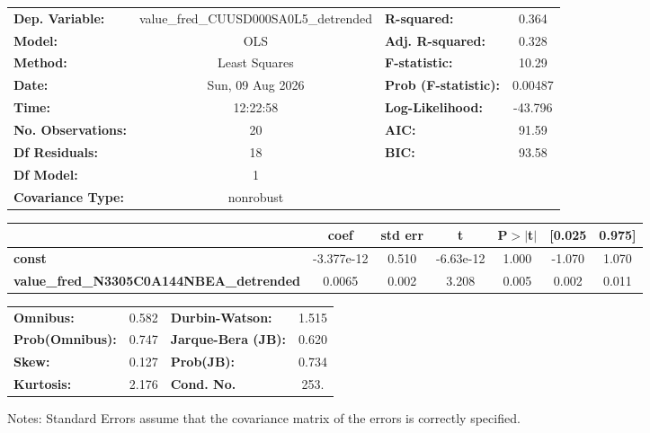 \begin{center}
\begin{tabular}{lclc}
\toprule
\textbf{Dep. Variable:}                          & value\_fred\_CUUSD000SA0L5\_detrended & \textbf{  R-squared:         } &     0.364   \\
\textbf{Model:}                                  &                  OLS                  & \textbf{  Adj. R-squared:    } &     0.328   \\
\textbf{Method:}                                 &             Least Squares             & \textbf{  F-statistic:       } &     10.29   \\
\textbf{Date:}                                   &            Sun, 09 Aug 2026           & \textbf{  Prob (F-statistic):} &  0.00487    \\
\textbf{Time:}                                   &                12:22:58               & \textbf{  Log-Likelihood:    } &   -43.796   \\
\textbf{No. Observations:}                       &                     20                & \textbf{  AIC:               } &     91.59   \\
\textbf{Df Residuals:}                           &                     18                & \textbf{  BIC:               } &     93.58   \\
\textbf{Df Model:}                               &                      1                & \textbf{                     } &             \\
\textbf{Covariance Type:}                        &               nonrobust               & \textbf{                     } &             \\
\bottomrule
\end{tabular}
\begin{tabular}{lcccccc}
                                                 & \textbf{coef} & \textbf{std err} & \textbf{t} & \textbf{P$> |$t$|$} & \textbf{[0.025} & \textbf{0.975]}  \\
\midrule
\textbf{const}                                   &   -3.377e-12  &        0.510     & -6.63e-12  &         1.000        &       -1.070    &        1.070     \\
\textbf{value\_fred\_N3305C0A144NBEA\_detrended} &       0.0065  &        0.002     &     3.208  &         0.005        &        0.002    &        0.011     \\
\bottomrule
\end{tabular}
\begin{tabular}{lclc}
\textbf{Omnibus:}       &  0.582 & \textbf{  Durbin-Watson:     } &    1.515  \\
\textbf{Prob(Omnibus):} &  0.747 & \textbf{  Jarque-Bera (JB):  } &    0.620  \\
\textbf{Skew:}          &  0.127 & \textbf{  Prob(JB):          } &    0.734  \\
\textbf{Kurtosis:}      &  2.176 & \textbf{  Cond. No.          } &     253.  \\
\bottomrule
\end{tabular}
\end{center}

Notes: \newline
 [1] Standard Errors assume that the covariance matrix of the errors is correctly specified.